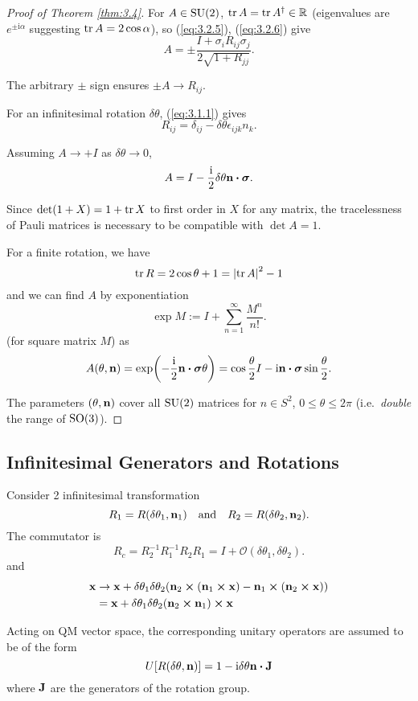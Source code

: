 \documentclass[a4paper,11pt]{article}
\begin{document}
\begin{proof}[Proof of Theorem \ref{thm:3.4}]
		For $A \in \operatorname{SU}(2)$, $\tr A = \tr A^\dagger \in \mathbb{R}$ (eigenvalues are $e ^{\pm \mathrm{i} \alpha}$ suggesting $\tr A = 2 \cos \alpha$), so (\ref{eq:3.2.5}), (\ref{eq:3.2.6}) give
		\[
			A = \pm \frac{I + \sigma_i R _{ij} \sigma_j}{2 \sqrt{1 + R _{jj}}}.
		\]
		 
		The arbitrary $\pm$ sign ensures $\pm A \to R _{ij}$.
		
		For an infinitesimal rotation $\delta \theta$, (\ref{eq:3.1.1}) gives
		\[
			R _{ij} = \delta _{ij} - \delta \theta \epsilon _{ijk} n_k.
		\]
		
		Assuming $A \to + I$ as $\delta \theta \to 0$, 
		\[
			A = I - \frac{\mathrm{i}}{2} \delta \theta \vb n \vdot \bm \sigma.
		\]
		
		Since $\det(1 + X) = 1 + \tr X$ to first order in $X$ for any matrix, the tracelessness of Pauli matrices is necessary to be compatible with $\det A = 1$.
		
		For a finite rotation, we have
		\[
			\tr R = 2 \cos \theta + 1 = \abs{\tr A}^2 - 1
		\]
		and we can find $A$ by exponentiation
		\[
			\exp M := I + \sum _{n=1}^\infty \frac{M^n}{n!}.
		\]
		(for square matrix $M$) as 
		\[
			A(\theta, \vb n) = \exp(- \frac{\mathrm{i}}{2} \vb n \vdot \bm \sigma \theta) = \cos \frac{\theta}{2} I - \mathrm{i} \vb n \vdot \bm \sigma \sin \frac{\theta}{2}.
		\]
		
		The parameters $(\theta,\vb n)$ cover all $\operatorname{SU}(2)$ matrices for $n \in S^2$, $0 \leq \theta \leq 2 \pi$ (i.e.\ \emph{double} the range of $\operatorname{SO}(3)$).
	\end{proof}

	\subsection{Infinitesimal Generators and Rotations}

	Consider 2 infinitesimal transformation
	\[
		R_1 = R (\delta \theta_1 , \vb n_1) \quad \text{and} \quad R_2 = R(\delta \theta_2, \vb n_2).
	\]
	The commutator is 
	\[
		R_c = R_2 ^{-1} R_1 ^{-1} R_2 R_1 = I + \mathcal{O}(\delta \theta_1, \delta \theta_2).
	\]
	and
	\begin{align*}
		\vb x & \to \vb x + \delta \theta_1 \delta \theta_2 (\vb n_2 \cross (\vb n_1 \cross \vb x) - \vb n_1 \cross (\vb n_2 \cross \vb x))\\
		& = \vb x + \delta \theta_1 \delta \theta_2 (\vb n_2 \cross \vb n_1) \cross \vb x
	\end{align*}

	Acting on QM vector space, the corresponding unitary operators are assumed to be of the form
	\[
		U[R(\delta \theta, \vb n)] = 1 - \mathrm{i} \delta \theta \vb n \vdot \vb J
	\]
	where $\vb J$ are the generators of the rotation group.
	
\end{document}
